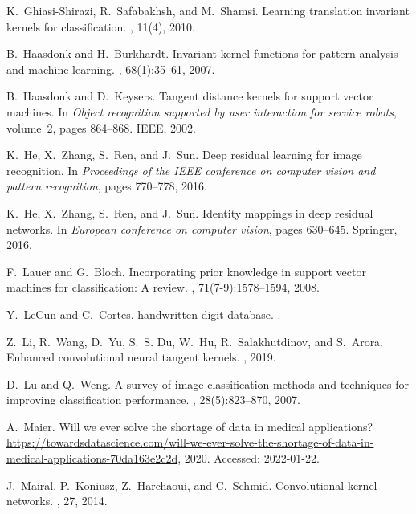 \documentclass{article}
\theoremstyle{plain}
\theoremstyle{definition}
\theoremstyle{remark}
\begin{document}
\begin{thebibliography}{10}
K.~Ghiasi-Shirazi, R.~Safabakhsh, and M.~Shamsi.
\newblock Learning translation invariant kernels for classification.
, 11(4), 2010.

B.~Haasdonk and H.~Burkhardt.
\newblock Invariant kernel functions for pattern analysis and machine learning.
, 68(1):35--61, 2007.

B.~Haasdonk and D.~Keysers.
\newblock Tangent distance kernels for support vector machines.
\newblock In {\em Object recognition supported by user interaction for service
  robots}, volume~2, pages 864--868. IEEE, 2002.

K.~He, X.~Zhang, S.~Ren, and J.~Sun.
\newblock Deep residual learning for image recognition.
\newblock In {\em Proceedings of the IEEE conference on computer vision and
  pattern recognition}, pages 770--778, 2016.

K.~He, X.~Zhang, S.~Ren, and J.~Sun.
\newblock Identity mappings in deep residual networks.
\newblock In {\em European conference on computer vision}, pages 630--645.
  Springer, 2016.

F.~Lauer and G.~Bloch.
\newblock Incorporating prior knowledge in support vector machines for
  classification: A review.
, 71(7-9):1578--1594, 2008.

Y.~LeCun and C.~Cortes.
 handwritten digit database.
.

Z.~Li, R.~Wang, D.~Yu, S.~S. Du, W.~Hu, R.~Salakhutdinov, and S.~Arora.
\newblock Enhanced convolutional neural tangent kernels.
, 2019.

D.~Lu and Q.~Weng.
\newblock A survey of image classification methods and techniques for improving
  classification performance.
, 28(5):823--870, 2007.

A.~Maier.
\newblock Will we ever solve the shortage of data in medical applications?
\newblock
  \url{https://towardsdatascience.com/will-we-ever-solve-the-shortage-of-data-in-medical-applications-70da163e2c2d},
  2020.
\newblock Accessed: 2022-01-22.

J.~Mairal, P.~Koniusz, Z.~Harchaoui, and C.~Schmid.
\newblock Convolutional kernel networks.
, 27, 2014.


\end{thebibliography}
\end{document}
